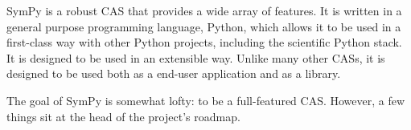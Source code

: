 SymPy is a robust CAS that provides a wide array of features. It is written in
a general purpose programming language, Python, which allows it to be used in
a first-class way with other Python projects, including the scientific Python
stack. It is designed to be used in an extensible way. Unlike many other CASs,
it is designed to be used both as a end-user application and as a library.

The goal of SymPy is somewhat lofty: to be a full-featured CAS\@. However, a
few things sit at the head of the project's roadmap.


%
